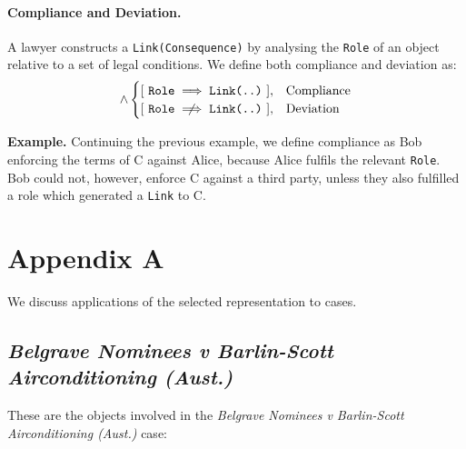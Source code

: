 \documentclass{article}
\numberwithin{equation}{section}
\newcommand{\quickexample}[1]{
\begin{tcolorbox}
	\textbf{Example.} #1
\end{tcolorbox}
}
\begin{document}
\paragraph{Compliance and Deviation.} A lawyer constructs a \texttt{Link(Consequence)} by analysing the \texttt{Role} of an object relative to a set of legal conditions. We define both compliance and deviation as:
\begin{equation}
[ \ \exists \ \texttt{Link(Existence, Consequence)} \ ] \land 
	\begin{cases}
		[ \ \texttt{Role} \implies \texttt{Link(..)} \ ], & \text{Compliance} \\
		[ \ \texttt{Role} \centernot\implies \texttt{Link(..)} \ ], & \text{Deviation}
	\end{cases}
\end{equation}

\vspace{0.25cm}
\quickexample{
	Continuing the previous example, we define compliance as Bob enforcing the terms of C against Alice, because Alice fulfils the relevant \texttt{Role}. Bob could not, however, enforce C against a third party, unless they also fulfilled a role which generated a \texttt{Link} to C.
}
















\pagebreak
\section{Appendix A}

We discuss applications of the selected representation to cases.

\subsection{\textit{Belgrave Nominees v Barlin-Scott Airconditioning (Aust.)}}  

These are the objects involved in the \textit{Belgrave Nominees v Barlin-Scott Airconditioning (Aust.)} case:
\end{document}
